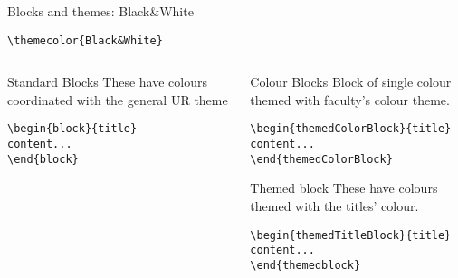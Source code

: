 \begingroup
{}
\begin{frame}[fragile]{Blocks and themes: Black\&White}
    \begin{center}\verb|\themecolor{Black&White}|\end{center}
\begin{columns} %
\begin{column}{0.3\textwidth}
\begin{block}{Standard Blocks}
These have colours coordinated with the general UR theme
\begin{verbatim}
\begin{block}{title}
content...
\end{block}
\end{verbatim}
\end{block}
\end{column}
\begin{column}{0.7\textwidth}
\begin{themedColorBlock}{Colour Blocks}
Block of single colour themed with faculty's colour theme.
\small
\begin{verbatim}
\begin{themedColorBlock}{title}
content...
\end{themedColorBlock}
\end{verbatim}
\end{themedColorBlock}
\begin{themedTitleBlock} {Themed block}
These have colours themed with the titles' colour.
\small
\begin{verbatim}
\begin{themedTitleBlock}{title}
content...
\end{themedblock}
\end{verbatim}
\end{themedTitleBlock}
\end{column}
\end{columns}
\end{frame}
\endgroup


